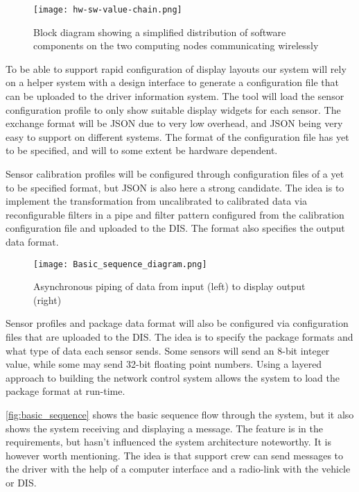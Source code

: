 \begin{figure}[!htbp]
	\texttt{[image: hw-sw-value-chain.png]}
	\caption{Block diagram showing a simplified distribution of software
	components on the two computing nodes communicating wirelessly}
	\label{fig:hw-sw-value-chain}
\end{figure}

To be able to support rapid configuration of display layouts our system will
rely on a helper system with a design interface to generate a configuration
file that can be uploaded to the driver information system. The tool will load 
the sensor configuration profile to only show suitable display widgets for each sensor. The 
exchange format will be JSON due to very low overhead, and JSON being very
easy to support on different
systems. The format of the configuration file has yet to be specified, and will
to some extent be hardware dependent.

Sensor calibration profiles will be configured through configuration files of a
yet to be specified format, but JSON is also here a strong candidate. The idea
is to implement the transformation from uncalibrated to calibrated data via
reconfigurable filters in a pipe and filter pattern configured from the
calibration configuration file and uploaded to the DIS. The format also
specifies the output data format. 

\begin{figure}[!htbp]
	\texttt{[image: Basic\_sequence\_diagram.png]}
	\caption{Asynchronous piping of data from input (left) to display output
	(right)}
	\label{fig:basic_sequence}
\end{figure}

Sensor profiles and package data format will also be configured via
configuration files that are uploaded to the DIS. The idea is to specify the
package formats and what type of data each sensor sends. Some sensors will send
an 8-bit integer value, while some may send 32-bit floating point numbers.
Using a layered approach to building the network control system allows the
system to load the package format at run-time. 

\vref{fig:basic_sequence} shows the basic sequence flow through the system, but
it also shows the system receiving and displaying a message. The feature is in
the requirements, but hasn't influenced the system architecture noteworthy. It
is however worth mentioning. The idea is that support crew can send messages to
the driver with the help of a computer interface and a radio-link with the
vehicle or DIS.

